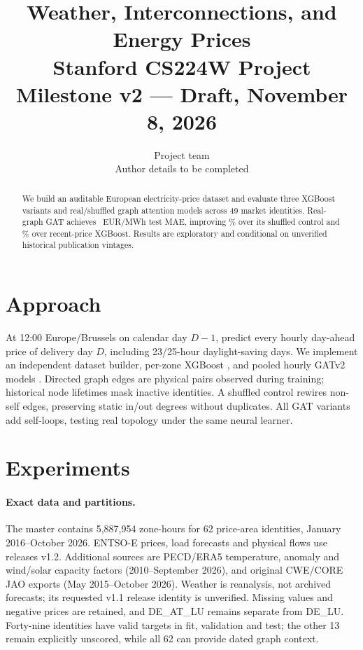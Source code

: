 \documentclass{article}
\title{Weather, Interconnections, and Energy Prices\\
  \small\normalfont Stanford CS224W Project Milestone v2 --- Draft, November 8, 2026}
\author{Project team\\\small Author details to be completed}
\begin{document}
\maketitle
\begin{abstract}
\ifdefined\ControlledStudyComplete
\ControlledAbstract
\else
We build an auditable European electricity-price dataset and evaluate three
XGBoost variants and real/shuffled graph attention models across 49 market
identities. Real-graph GAT achieves \SuiteGraphTest\ EUR/MWh test MAE, improving
\SuiteShuffleGain\% over its shuffled control and \SuiteXgbGain\% over recent-price
XGBoost. Results are exploratory and conditional on unverified historical
publication vintages.
\fi
\end{abstract}

\section{Approach}
At 12:00 Europe/Brussels on calendar day $D-1$, predict every hourly day-ahead
price of delivery day $D$, including 23/25-hour daylight-saving days. We implement
an independent dataset builder, per-zone XGBoost \cite{chen}, and pooled hourly
GATv2 models \cite{gat}. Directed graph edges are physical pairs observed during
training; historical node lifetimes mask inactive identities. A shuffled control
rewires non-self edges, preserving static in/out degrees without duplicates.
All GAT variants add self-loops, testing real topology under the same neural learner.

\section{Experiments}
\paragraph{Exact data and partitions.}
The master contains 5,887,954 zone-hours for 62 price-area identities, January
2016--October 2026. ENTSO-E prices, load forecasts and physical flows use releases
v1.2. Additional sources are PECD/ERA5 temperature, anomaly and wind/solar capacity
factors (2010--September 2026), and original CWE/CORE JAO exports
(May 2015--October 2026). Weather is reanalysis, not archived forecasts; its
requested v1.1 release identity is unverified. Missing values and negative prices
are retained, and DE\_AT\_LU remains separate from DE\_LU. Forty-nine identities
have valid targets in fit, validation and test; the other 13 remain explicitly
unscored, while all 62 can provide dated graph context.
\end{document}
